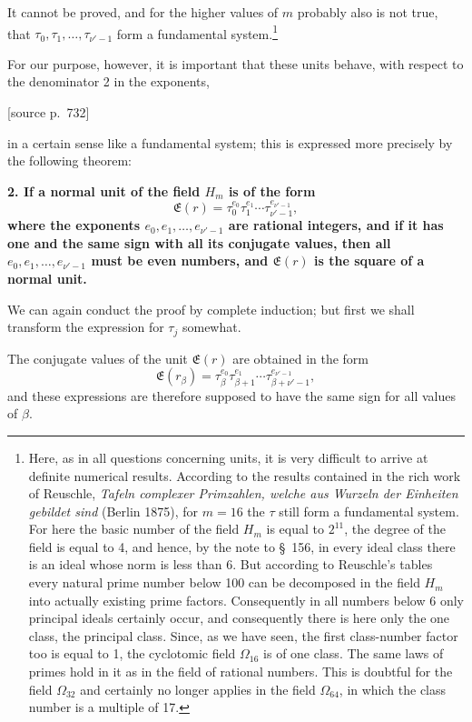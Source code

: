 \documentclass[11pt]{article}
\newcommand{\srcpage}[1]{\par\medskip\noindent\textsf{[source p.~#1]}\par\smallskip}
\begin{document}
It cannot be proved, and for the higher values of $m$ probably also is not true, that $\tau_0,\tau_1,\ldots,\tau_{\nu'-1}$ form a fundamental system.\footnote{Here, as in all questions concerning units, it is very difficult to arrive at definite numerical results. According to the results contained in the rich work of Reuschle, \emph{Tafeln complexer Primzahlen, welche aus Wurzeln der Einheiten gebildet sind} (Berlin 1875), for $m=16$ the $\tau$ still form a fundamental system. For here the basic number of the field $H_m$ is equal to $2^{11}$, the degree of the field is equal to 4, and hence, by the note to \S~156, in every ideal class there is an ideal whose norm is less than 6. But according to Reuschle's tables every natural prime number below 100 can be decomposed in the field $H_m$ into actually existing prime factors. Consequently in all numbers below 6 only principal ideals certainly occur, and consequently there is here only the one class, the principal class. Since, as we have seen, the first class-number factor too is equal to 1, the cyclotomic field $\Omega_{16}$ is of one class. The same laws of primes hold in it as in the field of rational numbers. This is doubtful for the field $\Omega_{32}$ and certainly no longer applies in the field $\Omega_{64}$, in which the class number is a multiple of 17.}

For our purpose, however, it is important that these units behave, with respect to the denominator 2 in the exponents,
\srcpage{732}
in a certain sense like a fundamental system; this is expressed more precisely by the following theorem:

\begin{center}\textbf{2. If a normal unit of the field $H_m$ is of the form
\[
\mathfrak E(r)=\tau_0^{e_0}\tau_1^{e_1}\cdots\tau_{\nu'-1}^{e_{\nu'-1}},
\]
where the exponents $e_0,e_1,
\ldots,e_{\nu'-1}$ are rational integers, and if it has one and the same sign with all its conjugate values, then all $e_0,e_1,\ldots,e_{\nu'-1}$ must be even numbers, and $\mathfrak E(r)$ is the square of a normal unit.}\end{center}

We can again conduct the proof by complete induction; but first we shall transform the expression for $\tau_j$ somewhat.

The conjugate values of the unit $\mathfrak E(r)$ are obtained in the form
\[
\mathfrak E(r_\beta)=\tau_\beta^{e_0}\tau_{\beta+1}^{e_1}\cdots\tau_{\beta+\nu'-1}^{e_{\nu'-1}},
\]
and these expressions are therefore supposed to have the same sign for all values of $\beta$.
\end{document}

